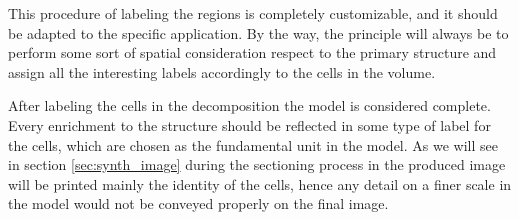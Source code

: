 \documentclass[12pt,a4paper]{report}
\begin{document}
    This procedure of labeling the regions is completely customizable, and it should be adapted to the specific application. By the way, the principle will always be to perform some sort of spatial consideration respect to the primary structure and assign all the interesting labels accordingly to the cells in the volume.

    After labeling the cells in the decomposition the model is considered complete. Every enrichment to the structure should be reflected in some type of label for the cells, which are chosen as the fundamental unit in the model. As we will see in section \ref{sec:synth_image} during the sectioning process in the produced image will be printed mainly the identity of the cells, hence any detail on a finer scale in the model would not be conveyed properly on the final image.
\end{document}
